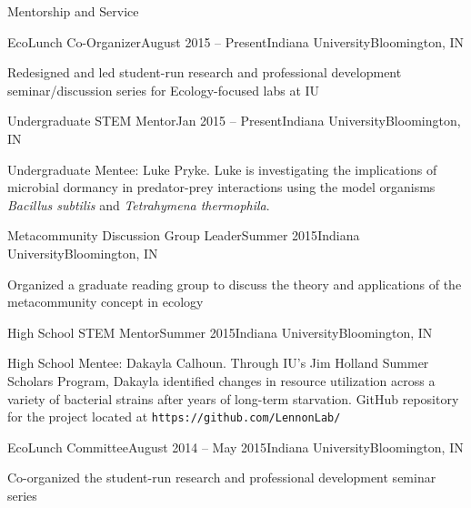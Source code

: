\documentclass{resume} %
\begin{document}
\begin{rSection}{Mentorship and Service}

\begin{rSubsection}{EcoLunch Co-Organizer}{August 2015 -- Present}{Indiana University}{Bloomington, IN}
\item Redesigned and led student-run research and professional development seminar/discussion series for Ecology-focused labs at IU
\end{rSubsection}

\begin{rSubsection}{Undergraduate STEM Mentor}{Jan 2015 -- Present}{Indiana University}{Bloomington, IN}
\item Undergraduate Mentee: Luke Pryke. Luke is investigating the implications of microbial dormancy in predator-prey interactions using the model organisms \emph{Bacillus subtilis} and \emph{Tetrahymena thermophila}.
\end{rSubsection}

\begin{rSubsection}{Metacommunity Discussion Group Leader}{Summer 2015}{Indiana University}{Bloomington, IN}
\item Organized a graduate reading group to discuss the theory and applications of the metacommunity concept in ecology
\end{rSubsection}

\begin{rSubsection}{High School STEM Mentor}{Summer 2015}{Indiana University}{Bloomington, IN}
\item High School Mentee: Dakayla Calhoun. Through IU's Jim Holland Summer Scholars Program, Dakayla identified changes in resource utilization across a variety of bacterial strains after years of long-term starvation. GitHub repository for the project located at {\tt https://github.com/LennonLab/}
\end{rSubsection}

\begin{rSubsection}{EcoLunch Committee}{August 2014 -- May 2015}{Indiana University}{Bloomington, IN}
\item Co-organized the student-run research and professional development seminar series
\end{rSubsection}

\end{rSection}
\end{document}

